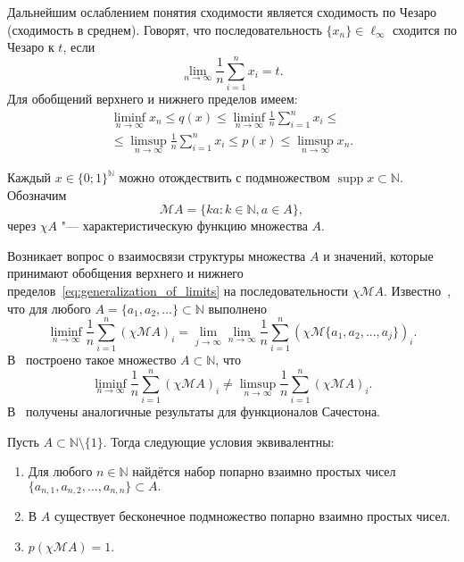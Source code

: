 Дальнейшим ослаблением понятия сходимости является сходимость по Чезаро (сходимость в среднем).
Говорят, что последовательность $\{x_n\}\in\ell_\infty$ сходится по Чезаро к $t$, если
\begin{equation*}
	\lim_{n\to\infty}\frac1{n}\sum_{i=1}^n x_i = t
	.
\end{equation*}
Для обобщений верхнего и нижнего пределов имеем:
\begin{multline}
	\label{eq:generalization_of_limits}
	\liminf_{n\to\infty} x_n \leq q(x) \leq \liminf_{n\to\infty}\frac1{n}\sum_{i=1}^n x_i
	\leq
	\\ \leq
	\limsup_{n\to\infty}\frac1{n}\sum_{i=1}^n x_i
	\leq p(x)
	\leq \limsup_{n\to\infty} x_n
	.
\end{multline}


Каждый $x\in \{0;1\}^\mathbb{N}$ можно отождествить с подмножеством
$\operatorname{supp} x \subset \mathbb{N}$.
Обозначим
\begin{equation*}
	\mathscr{M}A = \{ka: k\in\mathbb{N}, a\in A\}
	,
\end{equation*}
через $\chi A$ "--- характеристическую функцию множества $A$.

Возникает вопрос о взаимосвязи структуры множества $A$
и значений, которые принимают обобщения верхнего и нижнего пределов~\eqref{eq:generalization_of_limits}
на последовательности $\chi \mathscr{M}\!A$.
Известно~\cite{davenport1951sequences}, что для любого
$A=\{a_1,a_2,...\}\subset\mathbb{N}$
выполнено
\begin{equation*}
	\liminf_{n\to\infty}\frac1{n}\sum_{i=1}^n (\chi\mathscr{M}A)_i =
	\lim_{j\to\infty}\lim_{n\to\infty}\frac1{n}\sum_{i=1}^n (\chi\mathscr{M}\{a_1,a_2,...,a_j\})_i
	.
\end{equation*}
В~\cite[\S 7]{besicovitch1935density} построено такое множество $A\subset\mathbb{N}$, что
\begin{equation}
	\liminf_{n\to\infty}\frac1{n}\sum_{i=1}^n (\chi\mathscr{M}A)_i \neq
	\limsup_{n\to\infty}\frac1{n}\sum_{i=1}^n (\chi\mathscr{M}A)_i
	.
\end{equation}
В~\cite{avdeev2021vmzprimes} получены аналогичные результаты для функционалов Сачестона.
\begin{theorem}
	Пусть $A\subset \mathbb{N}\setminus\{1\}$.
	Тогда следующие условия эквивалентны:
	\begin{enumerate}%
		\item
			Для любого $n\in\mathbb{N}$ найдётся набор попарно взаимно простых чисел
			$
				\{a_{n,1}, a_{n,2}, ..., a_{n,n}  \} \subset A
				.
			$
		\item
			В $A$ существует бесконечное подмножество попарно взаимно простых чисел.
		\item
			$p(\chi\mathscr{M}A)=1$.
	\end{enumerate}
\end{theorem}





